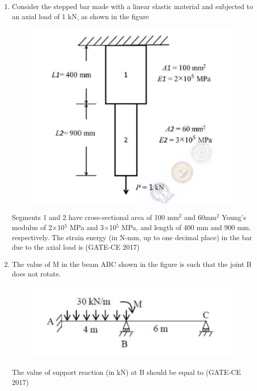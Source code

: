 \documentclass[journal,12pt,onecolumn]{article}
\theoremstyle{remark}
\begin{document}
\begin{enumerate}
    \item Consider the stepped bar made with a linear elastic material and subjected to an axial load of 1 kN, as shown in the figure 
    \begin{figure}[H]
    \centering
    \includegraphics[width=0.7\columnwidth]{imageq39.jpg}  
    \caption{}
    \label{fig:39}
    \end{figure}
    Segments 1 and 2 have cross-sectional area of 100 mm$^2$ and 60mm$^2$ Young's modulus of 2$\times$10$^5$ MPa and 3$\times$10$^5$ MPa, and length of 400 mm and 900 mm. respectively. The strain energy (in N-mm, up to one decimal place) in the bar due to the axial load is \underline{\hspace{3cm}}\hfill (GATE-CE 2017)

    \item The value of M in the beam ABC shown in the figure  is such that the joint B does not rotate.
    \begin{figure}[H]
    \centering
    \includegraphics[width=0.7\columnwidth]{imageq40.jpg}  
    \caption{}
    \label{fig:40}
    \end{figure}
    The value of support reaction (in kN) at B should be equal to \underline{\hspace{3cm}}\hfill (GATE-CE 2017)


\end{enumerate}
\end{document}
